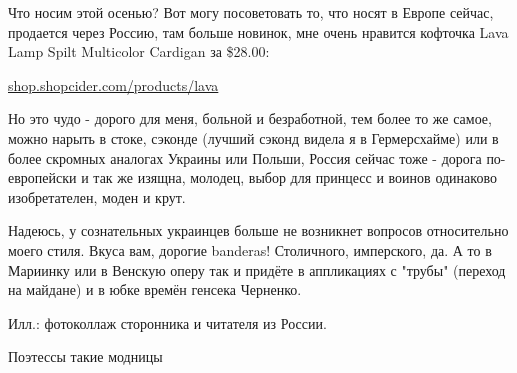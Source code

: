 Что носим этой осенью? Вот могу посоветовать то, что носят в Европе сейчас,
продается через Россию, там больше новинок, мне очень нравится кофточка Lava
Lamp Spilt Multicolor Cardigan за \$28.00:\par
\url{shop.shopcider.com/products/lava}

Но это чудо - дорого для меня, больной и безработной, тем более то же самое,
можно нарыть в стоке, сэконде (лучший сэконд видела я в Гермерсхайме) или в
более скромных аналогах Украины или Польши, Россия сейчас тоже - дорога
по-европейски и так же изящна, молодец, выбор для принцесс и воинов одинаково
изобретателен, моден и крут.

Надеюсь, у сознательных украинцев больше не возникнет вопросов относительно
моего стиля. Вкуса вам, дорогие banderas! Столичного, имперского, да. А то в
Мариинку или в Венскую оперу так и придёте в аппликациях с "трубы" (переход на
майдане) и в юбке времён генсека Черненко.

Илл.: фотоколлаж сторонника и читателя из России.

\begin{itemize} %
Поэтессы такие модницы
\end{itemize} %
